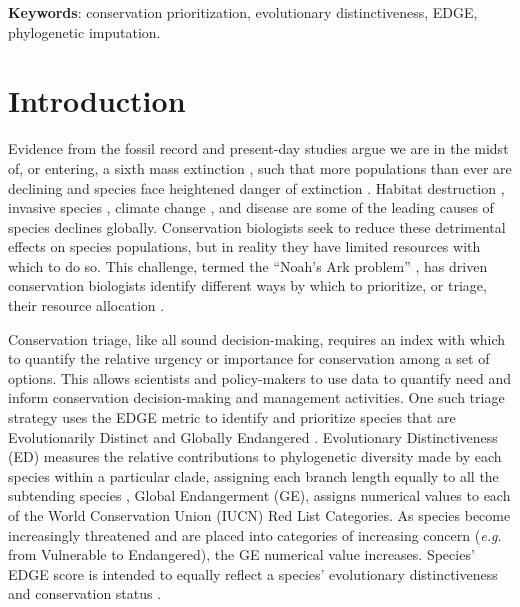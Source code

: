 \documentclass[12pt,english]{article}
\begin{document}
\textbf{Keywords}: conservation prioritization, evolutionary distinctiveness, 
EDGE, phylogenetic imputation.

\clearpage
\section*{Introduction}

Evidence from the fossil record and present-day studies argue we are in the
midst of, or entering, a sixth mass extinction \autocite{Barnosky2011,
Ceballos2015}, such that more populations than ever are declining and species
face heightened danger of extinction \autocite{Wake2008, Thomas2004}. Habitat
destruction \autocite{Brooks2002}, invasive species \autocite{Molnar2008},
climate change \autocite{Pounds2006}, and disease \autocite{Lips2006} are some
of the leading causes of species declines globally. Conservation biologists seek
to reduce these detrimental effects on species populations, but in reality they
have limited resources with which to do so. This challenge, termed the “Noah's
Ark problem” \autocite{Weitzman1998}, has driven conservation biologists
identify different ways by which to prioritize, or triage, their resource
allocation \autocite{Bottrill2008}.

Conservation triage, like all sound decision-making, requires an index  with
which to quantify the relative urgency or importance for conservation among a
set of options. This allows scientists and policy-makers to use data to quantify
need and inform conservation decision-making and management activities. One such
triage strategy uses the EDGE metric to identify and prioritize species that are
Evolutionarily Distinct and Globally Endangered \autocite{Isaac2007}.
Evolutionary Distinctiveness (ED) measures the relative contributions to
phylogenetic diversity made by each species within a particular clade, assigning
each branch length equally to all the subtending species \autocite{Isaac2007},
Global Endangerment (GE), assigns numerical values to each of the World
Conservation Union (IUCN) Red List Categories. As species become increasingly
threatened and are placed into categories of increasing concern (\emph{e.g.}
from Vulnerable to Endangered), the GE numerical value increases. Species' EDGE
score is intended to equally reflect a species' evolutionary distinctiveness and
conservation status \autocite[even if it does not always in practice; see][]{Pearse2015}.
\end{document}
